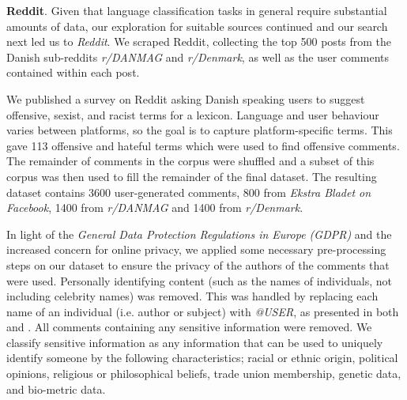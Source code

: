 \documentclass{article}
\begin{document}
\textbf{Reddit}. Given that language classification tasks in general require substantial amounts of data, our exploration for suitable sources continued and our search next led us to \textit{Reddit}. We scraped Reddit, collecting the top 500 posts from the Danish sub-reddits \textit{r/DANMAG} and \textit{r/Denmark}, as well as the user comments contained within each post. 

We published a survey on Reddit asking Danish speaking users to suggest offensive, sexist, and racist terms for a lexicon. Language and user behaviour varies between platforms, so the goal is to capture platform-specific terms. This gave 113 offensive and hateful terms which were used to find offensive comments. The remainder of comments in the corpus were shuffled and a subset of this corpus was then used to fill the remainder of the final dataset. The resulting dataset contains 3600 user-generated comments, 800 from \textit{Ekstra Bladet on Facebook}, 1400 from \textit{r/DANMAG} and 1400 from \textit{r/Denmark}. 

In light of the \textit{General Data Protection Regulations in Europe (GDPR)} and the increased concern for online privacy, we applied some necessary pre-processing steps on our dataset to ensure the privacy of the authors of the comments that were used. Personally identifying content (such as the names of individuals, not including celebrity names) was removed. This was handled by replacing each name of an individual (i.e. author or subject) with \textit{@USER}, as presented in both \cite{zampieri2019predicting} and \cite{davidson2017automated}. All comments containing any sensitive information were removed. We classify sensitive information as any information that can be used to uniquely identify someone by the following characteristics; racial or ethnic origin, political opinions, religious or philosophical beliefs, trade union membership, genetic data, and bio-metric data.
\end{document}
